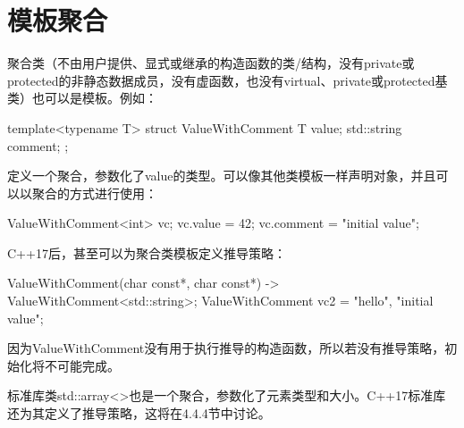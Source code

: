 \section{模板聚合}

聚合类（不由用户提供、显式或继承的构造函数的类/结构，没有private或protected的非静态数据成员，没有虚函数，也没有virtual、private或protected基类）也可以是模板。例如：

\begin{cpp}
template<typename T>
struct ValueWithComment {
	T value;
	std::string comment;
};
\end{cpp}

定义一个聚合，参数化了value的类型。可以像其他类模板一样声明对象，并且可以以聚合的方式进行使用：

\begin{cpp}
ValueWithComment<int> vc;
vc.value = 42;
vc.comment = "initial value";
\end{cpp}

C++17后，甚至可以为聚合类模板定义推导策略：

\begin{cpp}
ValueWithComment(char const*, char const*)
	-> ValueWithComment<std::string>;
ValueWithComment vc2 = {"hello", "initial value"};
\end{cpp}

因为ValueWithComment没有用于执行推导的构造函数，所以若没有推导策略，初始化将不可能完成。

标准库类std::array<>也是一个聚合，参数化了元素类型和大小。C++17标准库还为其定义了推导策略，这将在4.4.4节中讨论。
